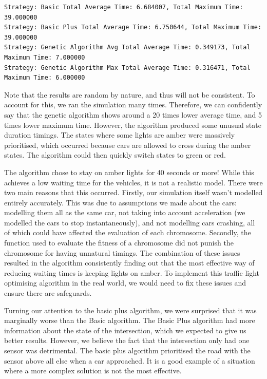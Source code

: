 \documentclass{article}
\begin{document}
\begin{lstlisting}
Strategy: Basic Total Average Time: 6.684007, Total Maximum Time: 39.000000
Strategy: Basic Plus Total Average Time: 6.750644, Total Maximum Time: 39.000000
Strategy: Genetic Algorithm Avg Total Average Time: 0.349173, Total Maximum Time: 7.000000
Strategy: Genetic Algorithm Max Total Average Time: 0.316471, Total Maximum Time: 6.000000
\end{lstlisting}


Note that the results are random by nature, and thus will not be consistent. To account for this, we ran the simulation many times. Therefore, we can confidently say that the genetic algorithm shows around a 20 times lower average time, and 5 times lower maximum time. However, the algorithm produced some unusual state duration timings. The states where some lights are amber were massively prioritised, which occurred because cars are allowed to cross during the amber states. The algorithm could then quickly switch states to green or red. 

The algorithm chose to stay on amber lights for 40 seconds or more! While this achieves a low waiting time for the vehicles, it is not a realistic model. There were two main reasons that this occurred. Firstly, our simulation itself wasn't modelled entirely accurately. This was due to assumptions we made about the cars: modelling them all as the same car, not taking into account acceleration (we modelled the cars to stop instantaneously), and not modelling cars crashing, all of which could have affected the evaluation of each chromosome. Secondly, the function used to evaluate the fitness of a chromosome did not punish the chromosome for having unnatural timings. The combination of these issues resulted in the algorithm consistently finding out that the most effective way of reducing waiting times is keeping lights on amber. To implement this traffic light optimising algorithm in the real world, we would need to fix these issues and ensure there are safeguards.

Turning our attention to the basic plus algorithm, we were surprised that it was marginally worse than the Basic algorithm. The Basic Plus algorithm had more information about the state of the intersection, which we expected to give us better results. However, we believe the fact that the intersection only had one sensor was detrimental. The basic plus algorithm prioritised the road with the sensor above all else when a car approached. It is a good example of a situation where a more complex solution is not the most effective.
\end{document}
